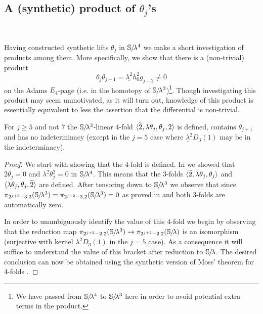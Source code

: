 \subsection{A (synthetic) product of $\theta_j$'s}\ 
\label{subsec:product-relation}

Having constructed synthetic lifts $\theta_j$ in $\operatorname{\mathbb{S}}\hspace{-2.2pt}/\!\lambda^4$ we make a short investigation of products among them. More specifically, we show that there is a (non-trivial) product
\[ \theta_j\theta_{j-1} = \underline{\lambda^2} h_0^2g_{j-2} \neq 0 \]
on the Adams $E_4$-page (i.e. in the homotopy of $\operatorname{\mathbb{S}}\hspace{-2.2pt}/\!\lambda^3$)\footnote{We have passed from $\operatorname{\mathbb{S}}\hspace{-2.2pt}/\!\lambda^4$ to $\operatorname{\mathbb{S}}\hspace{-2.2pt}/\!\lambda^3$ here in order to avoid potential extra terms in the product.}. %
Though investigating this product may seem unmotivated, as it will turn out, 
knowledge of this product is essentially equivalent to \Cref{thm:main} less the assertion that the differential is non-trivial. %

\begin{lem}\label{lem:theta-4-fold}
  For $j \geq 5$ and not $7$
  the $\operatorname{\mathbb{S}}\hspace{-2.2pt}/\!\lambda^3$-linear 4-fold
  $ \langle \wt{2}, \lambda \theta_j, \theta_j, 2 \rangle $
  is defined, contains $\theta_{j+1}$ and has no indeterminacy (except in the $j=5$ case where $\underline{\lambda}^2 D_3(1)$ may be in the indeterminacy).
\end{lem}

\begin{proof}
  We start with showing that the 4-fold is defined.
  In  we showed that $2\theta_j =0$ and $\lambda^2\theta_j^2 = 0$ in $\operatorname{\mathbb{S}}\hspace{-2.2pt}/\!\lambda^4$.
  This means that the 3-folds $\langle \wt{2}, \lambda \theta_j, \theta_j \rangle$ and $\langle \lambda \theta_j, \theta_j, \wt{2} \rangle$ are defined. After tensoring down to $\operatorname{\mathbb{S}}\hspace{-2.2pt}/\!\lambda^3$ we observe that since $\pi_{2^{j+2} - 3, 3}(\operatorname{\mathbb{S}}\hspace{-2.2pt}/\!\lambda^3) = \pi_{2^{j+2} - 3, 2}(\operatorname{\mathbb{S}}\hspace{-2.2pt}/\!\lambda^3) = 0$ as proved in  and  both 3-folds are automatically zero.

  In order to unambiguously identify the value of this 4-fold we begin by observing that the reduction map $ \pi_{2^{j+2} -2, 2}(\operatorname{\mathbb{S}}\hspace{-2.2pt}/\!\lambda^3) \to \pi_{2^{j+2} -2, 2}(\operatorname{\mathbb{S}}\hspace{-2.2pt}/\!\lambda)$ is an isomorphism (surjective with kernel $\underline{\lambda}^2D_3(1)$ in the $j=5$ case). As a consequence it will suffice to understand the value of this bracket after reduction to $\operatorname{\mathbb{S}}\hspace{-2.2pt}/\!\lambda$. The desired conclusion can now be obtained using the synthetic version of Moss' theorem for 4-folds \cite{cookware}. 
\end{proof}

